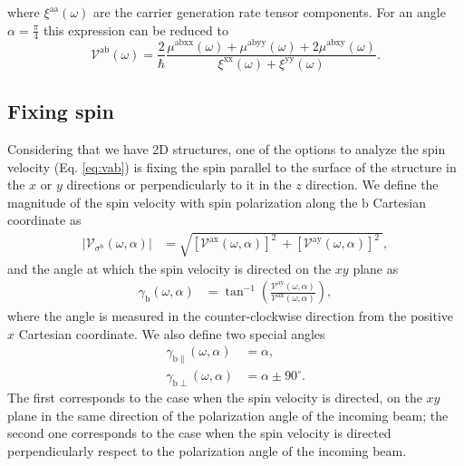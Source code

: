 \documentclass[prb,11pt,tightenlines,twocolumn,aps]{revtex4-1}
\begin{document}
{\color{red}
where $\xi^{\mathrm{aa}}(\omega)$ are the carrier generation rate tensor
components\cite{arzatePRB14}.
}
% 
For an angle $\alpha = \frac{\pi}{4}$ this expression can be reduced to 
\begin{equation*}\label{eq:vab-90deg}
\mathcal{V}^{\mathrm{ab}} (\omega)
= \frac{2}{\hbar}
\frac{\mu^{\mathrm{abxx}}(\omega) + \mu^{\mathrm{abyy}}(\omega) + 
2\mu^{\mathrm{abxy}}(\omega)}
{\xi^{\mathrm{xx}}(\omega) + \xi^{\mathrm{yy}}(\omega)}.
\end{equation*}



\subsection{Fixing spin}\label{sec:theory-fixspin}

{\color{red} Considering that we have 2D structures, one of the options to
analyze the spin velocity (Eq. \eqref{eq:vab}) is fixing the spin parallel to
the surface of the structure in the $x$ or $y$ directions or perpendicularly to
it in the $z$ direction. We define the magnitude of the spin velocity with spin
polarization along the $\mathrm{b}$ Cartesian coordinate as}
\begin{align}
|\mathcal{V}_{\sigma^{\mathrm{b}}}(\omega,\alpha)| 
&=
\sqrt{
[\mathcal{V}^{\mathrm{ax}}(\omega,\alpha)]^{2}\ +
[\mathcal{V}^{\mathrm{ay}}(\omega,\alpha)]^{2}\ 
}, 
\label{eq:vs-mag}
\end{align}
and the angle at which the spin velocity is directed on the $xy$ plane as
\begin{align}
\gamma_{\mathrm{b}} (\omega,\alpha)
&=
\tan^{-1} \left( \frac{\mathcal{V}^{\mathrm{ay}}(\omega,\alpha)}
{\mathcal{V}^{\mathrm{ax}}(\omega,\alpha)} \right),
\label{eq:gamma-ang}
\end{align}
where the angle is measured in the counter-clockwise direction from the positive
$x$ Cartesian coordinate. 
{\color{red}
We also define two special angles
\begin{align}
\gamma_{\mathrm{b \parallel}}(\omega,\alpha) &= \alpha, 
\label{eq:gamma-par} 
\\
\gamma_{\mathrm{b \perp}}(\omega,\alpha) &= \alpha \pm 90^{\circ}.
\label{eq:gamma-perp}
\end{align}
The first corresponds to the case when the spin velocity is directed, on the
$xy$ plane in the same direction of the polarization angle of the incoming beam;
the second one corresponds to the case when the spin velocity is directed
perpendicularly respect to the polarization angle of the incoming beam.
}
\end{document}
